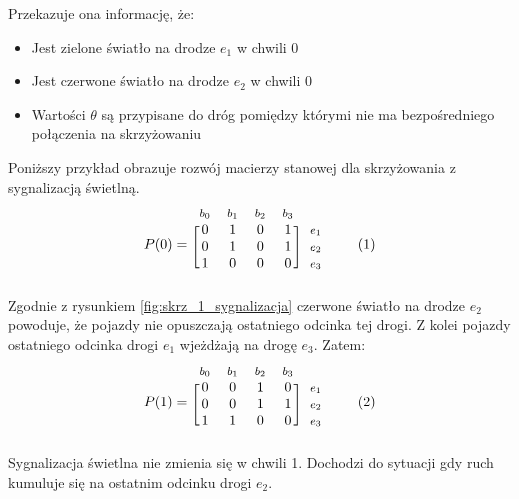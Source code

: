 \documentclass[12pt]{book}
\theoremstyle{plain}
\newcommand\addtag{\refstepcounter{equation}
\renewcommand{\labelenumii}{\theenumii}
\renewcommand{\theenumii}{\theenumi.\arabic{enumii}.}
\tag{\theequation}}
\begin{document}
Przekazuje ona informację, że:
\begin{itemize}
\item Jest zielone światło na drodze $e_1$ w chwili 0 
\item Jest czerwone światło na drodze $e_2$ w chwili 0
\item Wartości $\theta$ są przypisane do dróg pomiędzy którymi nie ma bezpośredniego połączenia na skrzyżowaniu
\end{itemize}
Poniższy przykład obrazuje rozwój macierzy stanowej dla skrzyżowania z sygnalizacją świetlną.
\begin{equation*}
  P(0)=
  \begin{blockarray}{*{4}{c} l}
    \begin{block}{*{4}{>{$\footnotesize}c<{$}} l}
      $b_0$ & $b_1$ & $b_2$ & $b_3$ \\
    \end{block}
    \begin{block}{[*{4}{c}]>{$\footnotesize}l<{$}}
       0 & 1 & 0 & 1 & $e_1$ \\
       0 & 1 & 0 & 1 & $e_2$ \\
       1 & 0 & 0 & 0 & $e_3$ \\
    \end{block}
  \end{blockarray} \addtag \label{skrz_1_zmiennaStanu_0_sygnalizacja}
\end{equation*}
Zgodnie z rysunkiem \ref{fig:skrz_1_sygnalizacja} czerwone światło na drodze $e_2$ powoduje, że pojazdy nie opuszczają ostatniego odcinka tej drogi. Z kolei pojazdy ostatniego odcinka drogi $e_1$ wjeżdżają na drogę $e_3$. Zatem: 
\begin{equation*}
  P(1)=
  \begin{blockarray}{*{4}{c} l}
    \begin{block}{*{4}{>{$\footnotesize}c<{$}} l}
      $b_0$ & $b_1$ & $b_2$ & $b_3$ \\
    \end{block}
    \begin{block}{[*{4}{c}]>{$\footnotesize}l<{$}}
       0 & 0 & 1 & 0 & $e_1$ \\
       0 & 0 & 1 & 1 & $e_2$ \\
       1 & 1 & 0 & 0 & $e_3$ \\
    \end{block}
  \end{blockarray} \addtag \label{skrz_1_zmiennaStanu_0_sygnalizacja}
\end{equation*}
Sygnalizacja świetlna nie zmienia się w chwili 1. Dochodzi do sytuacji gdy ruch kumuluje się na ostatnim odcinku drogi $e_2$.
\end{document}
